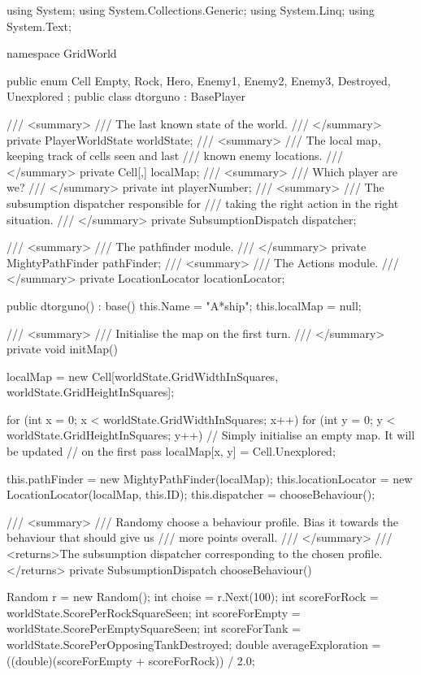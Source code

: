 \documentclass[11pt]{article}
\begin{document}
\begin{code}
using System;
using System.Collections.Generic;
using System.Linq;
using System.Text;

namespace GridWorld
{
    public enum Cell { Empty, Rock, Hero, Enemy1, Enemy2, Enemy3, Destroyed, Unexplored };
    public class dtorguno : BasePlayer
    {
        /// <summary>
        /// The last known state of the world.
        /// </summary>
        private PlayerWorldState worldState;
        /// <summary>
        /// The local map, keeping track of cells seen and last
        /// known enemy locations.
        /// </summary>
        private Cell[,] localMap;
        /// <summary>
        /// Which player are we?
        /// </summary>
        private int playerNumber;
        /// <summary>
        /// The subsumption dispatcher responsible for
        /// taking the right action in the right situation.
        /// </summary>
        private SubsumptionDispatch dispatcher;

        /// <summary>
        /// The pathfinder module.
        /// </summary>
        private MightyPathFinder pathFinder;
        /// <summary>
        /// The Actions module.
        /// </summary>
        private LocationLocator locationLocator;

        public dtorguno()
            : base()
        {
            this.Name = "A*ship";
            this.localMap = null;
        }

        /// <summary>
        /// Initialise the map on the first turn.
        /// </summary>
        private void initMap() {
            localMap = new Cell[worldState.GridWidthInSquares, 
                                worldState.GridHeightInSquares];

            for (int x = 0; x < worldState.GridWidthInSquares; x++)
            {
                for (int y = 0; y < worldState.GridHeightInSquares; y++)
                {
                    // Simply initialise an empty map. It will be updated
                    // on the first pass
                    localMap[x, y] = Cell.Unexplored;
                }
            }

            this.pathFinder = new MightyPathFinder(localMap);
            this.locationLocator = new LocationLocator(localMap, this.ID);
            this.dispatcher = chooseBehaviour();
        }

        /// <summary>
        /// Randomy choose a behaviour profile. Bias it towards the behaviour that should give us
        /// more points overall.
        /// </summary>
        /// <returns>The subsumption dispatcher corresponding to the chosen profile.</returns>
        private SubsumptionDispatch chooseBehaviour()
        {
            Random r = new Random();
            int choise = r.Next(100);
            int scoreForRock = worldState.ScorePerRockSquareSeen;
            int scoreForEmpty = worldState.ScorePerEmptySquareSeen;
            int scoreForTank = worldState.ScorePerOpposingTankDestroyed;
            double averageExploration = ((double)(scoreForEmpty + scoreForRock)) / 2.0;

}}}
\end{code}
\end{document}
